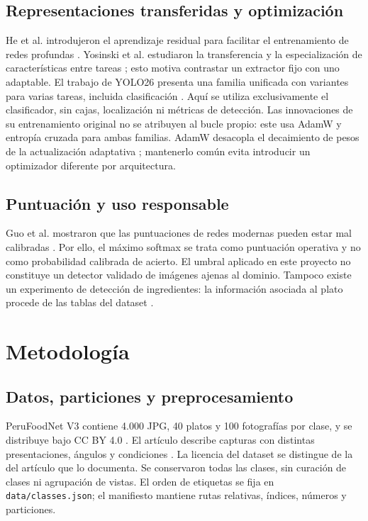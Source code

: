 \documentclass[conference]{IEEEtran}
\newcommand{\artifact}[1]{\texttt{\small #1}}
\begin{document}
\subsection{Representaciones transferidas y optimización}
He et al. introdujeron el aprendizaje residual para facilitar el entrenamiento de redes profundas \cite{he2016}. Yosinski et al. estudiaron la transferencia y la especialización de características entre tareas \cite{yosinski2014}; esto motiva contrastar un extractor fijo con uno adaptable. El trabajo de YOLO26 presenta una familia unificada con variantes para varias tareas, incluida clasificación \cite{jocher2026}. Aquí se utiliza exclusivamente el clasificador, sin cajas, localización ni métricas de detección. Las innovaciones de su entrenamiento original no se atribuyen al bucle propio: este usa AdamW y entropía cruzada para ambas familias. AdamW desacopla el decaimiento de pesos de la actualización adaptativa \cite{loshchilov2019}; mantenerlo común evita introducir un optimizador diferente por arquitectura.

\subsection{Puntuación y uso responsable}
Guo et al. mostraron que las puntuaciones de redes modernas pueden estar mal calibradas \cite{guo2017}. Por ello, el máximo softmax se trata como puntuación operativa y no como probabilidad calibrada de acierto. El umbral aplicado en este proyecto no constituye un detector validado de imágenes ajenas al dominio. Tampoco existe un experimento de detección de ingredientes: la información asociada al plato procede de las tablas del dataset \cite{arzola2025}.

\section{Metodología}
\subsection{Datos, particiones y preprocesamiento}
PeruFoodNet V3 contiene 4.000 JPG, 40 platos y 100 fotografías por clase, y se distribuye bajo CC BY 4.0 \cite{perufoodnetv3}. El artículo describe capturas con distintas presentaciones, ángulos y condiciones \cite{arzola2025}. La licencia del dataset se distingue de la del artículo que lo documenta. Se conservaron todas las clases, sin curación de clases ni agrupación de vistas. El orden de etiquetas se fija en \artifact{data/classes.json}; el manifiesto mantiene rutas relativas, índices, números y particiones.
\end{document}
